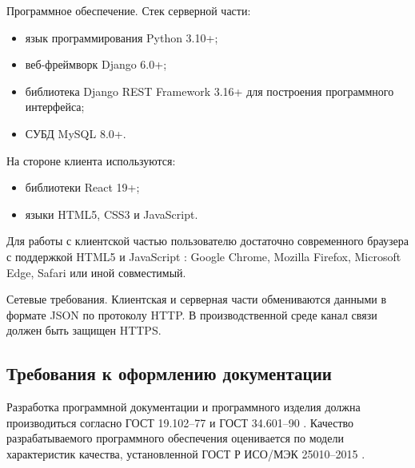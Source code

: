 Программное обеспечение. Стек серверной части:
\begin{itemize}
    \item язык программирования Python 3.10+;
    \item веб-фреймворк Django 6.0+;
    \item библиотека Django REST Framework 3.16+ для построения программного интерфейса;
    \item СУБД MySQL 8.0+.
\end{itemize}

На стороне клиента используются:
\begin{itemize}
    \item библиотеки React 19+;
    \item языки HTML5, CSS3 и JavaScript.
\end{itemize}

Для работы с клиентской частью пользователю достаточно современного браузера с поддержкой HTML5 и JavaScript \cite{mdn_docs}: Google Chrome, Mozilla Firefox, Microsoft Edge, Safari или иной совместимый.

Сетевые требования. Клиентская и серверная части обмениваются данными в формате JSON по протоколу HTTP. В производственной среде канал связи должен быть защищен HTTPS.

\subsection{Требования к оформлению документации}

Разработка программной документации и программного изделия должна производиться согласно ГОСТ 19.102--77 \cite{gost19102} и ГОСТ 34.601--90 \cite{gost34601}. Качество разрабатываемого программного обеспечения оценивается по модели характеристик качества, установленной ГОСТ Р ИСО/МЭК 25010--2015 \cite{gost25010}.
